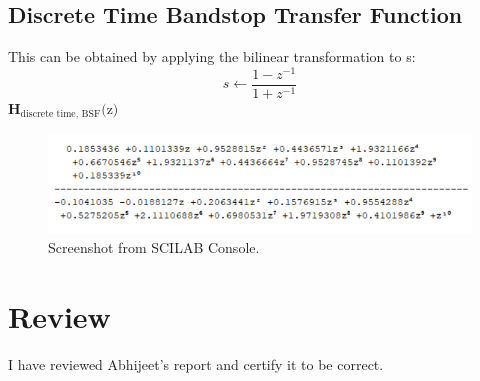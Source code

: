 \documentclass[12pt]{article}
\begin{document}
\subsection{Discrete Time Bandstop Transfer Function}
This can be obtained by applying the bilinear transformation to s:
\[s \leftarrow \frac{1 - z^{-1}}{1 + z^{-1}}\]
\textbf{H$_{\text{discrete time, BSF}}\text{(z)}$}
\begin{figure}[h]
    \centering
    \includegraphics[width=\textwidth]{h_discrete_time_Bandstop.png}
    \caption{Screenshot from SCILAB Console.}
\end{figure}

\section{Review}
I have reviewed Abhijeet's report and certify it to be correct.
\end{document}
